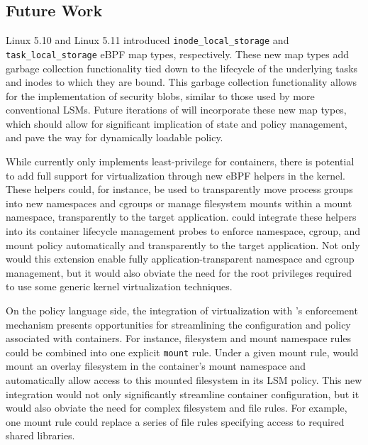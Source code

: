 \subsection{Future Work}
\label{sub:future_work}

Linux 5.10 and Linux 5.11 introduced \texttt{inode\_local\_storage} \cite{singh2020_inode_local_storage} and \texttt{task\_local\_storage} \cite{singh2020_task_local_storage} eBPF map types, respectively. These new map types add garbage collection functionality tied down to the lifecycle of the underlying tasks and inodes to which they are bound. This garbage collection functionality allows for the implementation of security blobs, similar to those used by more conventional LSMs. Future iterations of \bpfcontain{} will incorporate these new map types, which should allow for significant implication of state and policy management, and pave the way for dynamically loadable \bpfcontain{} policy.

While \bpfcontain{} currently only implements least-privilege for containers, there is potential to add full support for virtualization through new eBPF helpers in the kernel. These helpers could, for instance, be used to transparently move process groups into new namespaces and cgroups or manage filesystem mounts within a mount namespace, transparently to the target application. \bpfcontain{} could integrate these helpers into its container lifecycle management probes to enforce namespace, cgroup, and mount policy automatically and transparently to the target application. Not only would this extension enable fully application-transparent namespace and cgroup management, but it would also obviate the need for the root privileges required to use some generic kernel virtualization techniques.

On the policy language side, the integration of virtualization with \bpfcontain{}'s enforcement mechanism presents opportunities for streamlining the configuration and policy associated with \bpfcontain{} containers. For instance, filesystem and mount namespace rules could be combined into one explicit \texttt{mount} rule. Under a given mount rule, \bpfcontain{} would mount an overlay filesystem in the container's mount namespace and automatically allow access to this mounted filesystem in its LSM policy. This new integration would not only significantly streamline container configuration, but it would also obviate the need for complex filesystem and file rules. For example, one mount rule could replace a series of file rules specifying access to required shared libraries.

